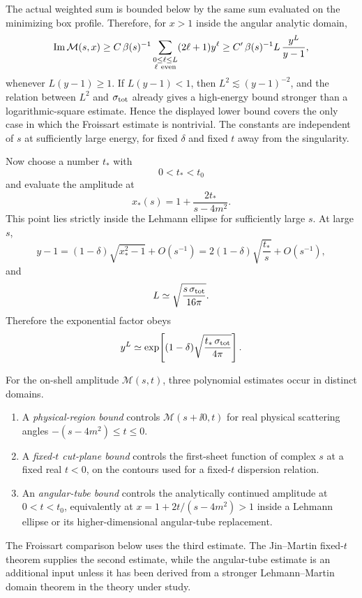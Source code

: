 The actual weighted sum is bounded below by the same sum evaluated on the
minimizing box profile.  Therefore, for \(x>1\) inside the angular analytic
domain,
  \begin{equation}
  \operatorname{Im}\mathcal M(s,x)
  \ge
  C\,\beta(s)^{-1}
  \sum_{\substack{0\le\ell\le L\\ \ell\ {\rm even}}}
  (2\ell+1)y^\ell
  \ge
  C'\,\beta(s)^{-1}L\,\frac{y^L}{y-1},
  \label{eq:froissart-box-lower-bound}
  \end{equation}
whenever \(L(y-1)\ge1\).  If \(L(y-1)<1\), then
\(L^2\lesssim (y-1)^{-2}\), and the relation between \(L^2\) and
\(\sigma_{\rm tot}\) already gives a high-energy bound stronger than a
logarithmic-square estimate.  Hence the displayed lower bound covers the only
case in which the Froissart estimate is nontrivial.  The constants are
independent of \(s\) at sufficiently large energy, for fixed \(\delta\) and
fixed \(t\) away from the singularity.

Now choose a number \(t_*\) with
\[
  0<t_*<t_0
\]
and evaluate the amplitude at
\[
  x_*(s)=1+\frac{2t_*}{s-4m^2}.
\]
This point lies strictly inside the Lehmann ellipse for sufficiently large
\(s\).  At large \(s\),
  \begin{equation}
  y-1=(1-\delta)\sqrt{x_*^2-1}+O(s^{-1})
  =
  2(1-\delta)\sqrt{\frac{t_*}{s}}+O(s^{-1}),
  \label{eq:froissart-y-minus-one}
  \end{equation}
and
\[
  L\simeq\sqrt{\frac{s\,\sigma_{\rm tot}}{16\pi}} .
\]
Therefore the exponential factor obeys
  \begin{equation}
  y^L
  \simeq
  \exp\!\left[
    (1-\delta)
    \sqrt{\frac{t_*\,\sigma_{\rm tot}}{4\pi}}
  \right].
  \label{eq:froissart-exponential-factor}
  \end{equation}

\begin{definition}
\label{def:physical-fixedt-angular-polynomial-bounds}
For the on-shell amplitude \(\mathcal M(s,t)\), three polynomial estimates
occur in distinct domains.
\begin{enumerate}
  \item A \emph{physical-region bound} controls
  \(\mathcal M(s+\ii0,t)\) for real physical scattering angles
  \(-(s-4m^2)\le t\le0\).
  \item A \emph{fixed-\(t\) cut-plane bound} controls the first-sheet function
  of complex \(s\) at a fixed real \(t<0\), on the contours used for a
  fixed-\(t\) dispersion relation.
  \item An \emph{angular-tube bound} controls the analytically continued
  amplitude at \(0<t<t_0\), equivalently at
  \(x=1+2t/(s-4m^2)>1\) inside a Lehmann ellipse or its
  higher-dimensional angular-tube replacement.
\end{enumerate}
The Froissart comparison below uses the third estimate.  The Jin--Martin
fixed-\(t\) theorem supplies the second estimate, while the angular-tube
estimate is an additional input unless it has been derived from a stronger
Lehmann--Martin domain theorem in the theory under study.
\end{definition}

